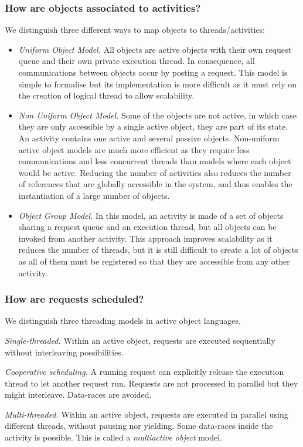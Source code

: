 \subsubsection{How are objects associated to activities?}\label{sec:activity}
We distinguish three different ways to map objects to threads/activities: 
\begin{itemize}
\item \textit{Uniform Object Model.}  All objects are active objects
  with their own request queue and their own private execution thread.
  In consequence, all communications between objects occur by posting
  a request. This model is simple to formalise but its implementation
  is more difficult as it must rely on the creation of logical thread
  to allow scalability.
\item \textit{Non Uniform Object Model.}  Some of the objects are not
  active, in which case they are only accessible by a single active
  object, they are part of its state. 
An activity contains one active and several passive objects. Non-uniform active object models
  are much more efficient as they require less communications and
  less concurrent threads than models where each object would be
  active. Reducing the number of activities also reduces the number of
  references that are globally accessible in the system, and thus enables the
  instantiation of a large number of objects.
\item \textit{Object Group Model.}
In this model, an activity is made of a set of objects sharing a
request queue and an execution thread, but all
objects can be invoked from another activity. This
approach improves scalability as it reduces the number of threads, but
it is still difficult to create a lot of objects as all of them must
be registered so that they are accessible from any other activity.
\end{itemize}

\subsubsection{How are requests scheduled?}
We distinguish three  threading models in active object languages.
\begin{description}
\item \textit{Single-threaded.} 
Within an active object, requests are executed sequentially without
interleaving possibilities. 
\item \textit{Cooperative scheduling.}
A running request can explicitly release the execution thread to let
another request run. Requests are not processed in parallel but they
might interleave. Data-races are avoided.
\item \textit{Multi-threaded.}
Within an active object, requests are executed in parallel using
different threads, without pausing nor yielding.
Some data-races inside the activity is possible. This is
called a \emph{multiactive object} model.
\end{description}

